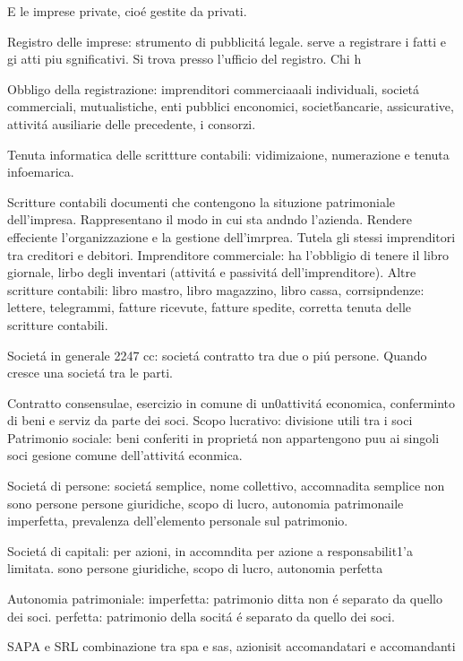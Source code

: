 \documentclass{article}
\begin{document}
E le imprese private, cio\'e gestite da privati.


Registro delle imprese:
strumento di pubblicit\'a legale. serve a registrare i fatti e gi atti pi\0u sgnificativi. Si trova presso l'ufficio del registro. Chi h 

Obbligo della registrazione: imprenditori commerciaaali individuali, societ\'a commerciali, mutualistiche, enti pubblici enconomici, societ\' bancarie, assicurative, attivit\'a ausiliarie delle precedente, i consorzi. 

Tenuta informatica delle scrittture contabili: vidimizaione, numerazione e tenuta infoemarica.

Scritture contabili
documenti che contengono la situzione patrimoniale dell'impresa. Rappresentano il modo in cui sta andndo l'azienda. Rendere effeciente l'organizzazione e la gestione dell'imrprea. Tutela gli stessi imprenditori tra creditori e debitori. 
Imprenditore commerciale: ha l'obbligio di tenere il libro giornale, lirbo degli inventari (attivit\'a e passivit\'a dell'imprenditore). 
Altre scritture contabili: libro mastro, libro magazzino, libro cassa, corrsipndenze: lettere, telegrammi, fatture ricevute, fatture spedite, corretta tenuta delle scritture contabili.



Societ\'a in generale
2247 cc: societ\'a contratto tra due o pi\'u persone. Quando cresce una societ\'a  tra le parti.

Contratto consensulae, esercizio in comune di un0attivit\'a economica, conferminto di beni e serviz da parte dei soci. 
Scopo lucrativo: divisione utili tra i soci
Patrimonio sociale: beni conferiti in propriet\'a non appartengono pu\0u ai singoli soci
gesione comune dell'attivit\'a econmica.


Societ\'a di persone: societ\'a semplice, nome collettivo, accomnadita semplice
non sono persone persone giuridiche, scopo di lucro, autonomia patrimonaile imperfetta, prevalenza dell'elemento personale sul patrimonio. 


Societ\'a di capitali:
per azioni, in accomndita per azione
a responsabilit1'a limitata.
sono persone giuridiche, scopo di lucro, autonomia perfetta


Autonomia patrimoniale: 
imperfetta: patrimonio ditta non \'e separato da quello dei soci.
perfetta: patrimonio della socit\'a \'e separato da quello dei soci. 


SAPA e SRL
combinazione tra spa e sas, azionisit accomandatari e accomandanti
\end{document}
